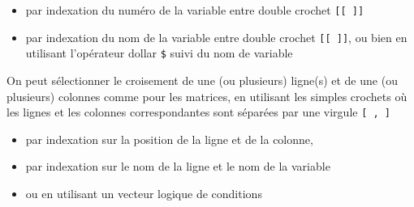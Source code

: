 \documentclass[
]{book}
\newenvironment{Shaded}{\begin{snugshade}}{\end{snugshade}}
\newcommand{\CommentTok}[1]{\textcolor[rgb]{0.56,0.35,0.01}{\textit{#1}}}
\newcommand{\DecValTok}[1]{\textcolor[rgb]{0.00,0.00,0.81}{#1}}
\newcommand{\DocumentationTok}[1]{\textcolor[rgb]{0.56,0.35,0.01}{\textbf{\textit{#1}}}}
\newcommand{\NormalTok}[1]{#1}
\newcommand{\SpecialCharTok}[1]{\textcolor[rgb]{0.81,0.36,0.00}{\textbf{#1}}}
\newcommand{\StringTok}[1]{\textcolor[rgb]{0.31,0.60,0.02}{#1}}
\providecommand{\tightlist}{%
  \setlength{\itemsep}{0pt}\setlength{\parskip}{0pt}}
\begin{document}
\begin{itemize}
\tightlist
\item
  par indexation du numéro de la variable entre double crochet \texttt{{[}{[}\ {]}{]}}
\item
  par indexation du nom de la variable entre double crochet \texttt{{[}{[}\ {]}{]}}, ou bien en utilisant l'opérateur dollar \texttt{\$} suivi du nom de variable
\end{itemize}

\begin{Shaded}
\end{Shaded}

On peut sélectionner le croisement de une (ou plusieurs) ligne(s) et de une (ou plusieurs) colonnes comme pour les matrices, en utilisant les simples crochets où les lignes et les colonnes correspondantes sont séparées par une virgule \texttt{{[}\ ,\ {]}}

\begin{itemize}
\tightlist
\item
  par indexation sur la position de la ligne et de la colonne,
\item
  par indexation sur le nom de la ligne et le nom de la variable
\item
  ou en utilisant un vecteur logique de conditions
\end{itemize}
\end{document}
